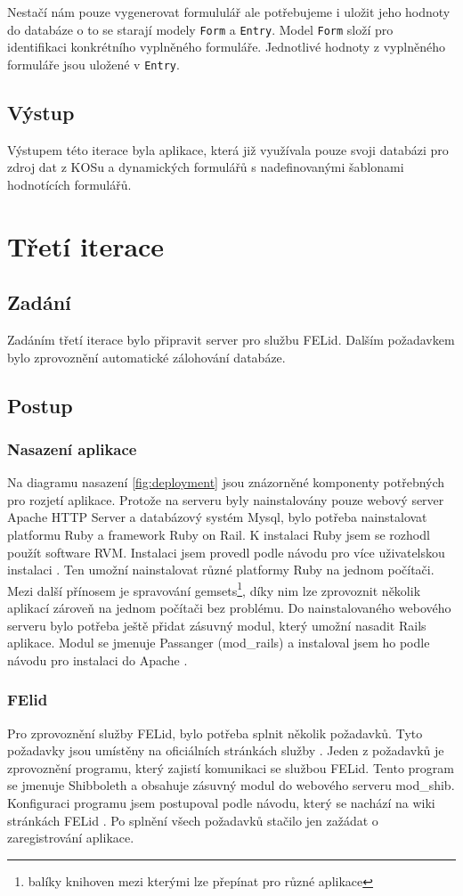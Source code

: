 Nestačí nám pouze vygenerovat formululář ale potřebujeme i uložit jeho hodnoty do databáze o to se starají modely \verb|Form| a \verb|Entry|. Model \verb|Form| složí pro identifikaci konkrétního vyplněného formuláře. Jednotlivé hodnoty z vyplněného formuláře jsou uložené v \verb|Entry|.

\subsection{Výstup} 
Výstupem této iterace byla aplikace, která již využívala pouze svoji databázi pro zdroj dat z KOSu a dynamických formulářů s nadefinovanými šablonami hodnotících formulářů.

\section{Třetí iterace}
\subsection{Zadání}
Zadáním třetí iterace bylo připravit server pro službu FELid. Dalším požadavkem bylo zprovoznění automatické zálohování databáze.

\subsection{Postup}
\subsubsection{Nasazení aplikace}
Na diagramu nasazení \ref{fig:deployment} jsou znázorněné komponenty potřebných pro rozjetí aplikace. Protože na serveru byly nainstalovány pouze webový server Apache HTTP Server a databázový systém Mysql, bylo potřeba nainstalovat platformu Ruby a framework Ruby on Rail. K instalaci Ruby jsem se rozhodl použít software RVM. Instalaci jsem provedl podle návodu pro více uživatelskou instalaci \cite{RVM}. Ten umožní nainstalovat různé platformy Ruby na jednom počítači. Mezi další přínosem je spravování gemsets\footnote{balíky knihoven mezi kterými lze přepínat pro různé aplikace}, díky nim lze zprovoznit několik aplikací zároveň na jednom počítači bez problému. Do nainstalovaného webového serveru bylo potřeba ještě přidat zásuvný modul, který umožní nasadit Rails aplikace. Modul se jmenuje Passanger (mod\_rails) a instaloval jsem ho podle návodu pro instalaci do Apache \cite{passenger}.

\subsubsection{FElid}
Pro zprovoznění služby FELid, bylo potřeba splnit několik požadavků. Tyto požadavky jsou umístěny na oficiálních stránkách služby \cite{felid_pozadavky}. Jeden z požadavků je zprovoznění programu, který zajistí komunikaci se službou FELid. Tento program se jmenuje Shibboleth a obsahuje zásuvný modul do webového serveru mod\_shib. Konfiguraci programu jsem postupoval podle návodu, který se nachází na wiki stránkách FELid \citep{felid}. Po splnění všech požadavků stačilo jen zažádat o zaregistrování aplikace.

